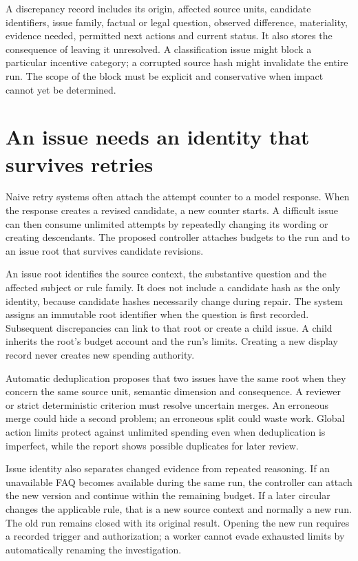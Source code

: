 A discrepancy record includes its origin, affected source units, candidate
identifiers, issue family, factual or legal question, observed difference,
materiality, evidence needed, permitted next actions and current status. It also
stores the consequence of leaving it unresolved. A classification issue might
block a particular incentive category; a corrupted source hash might invalidate
the entire run. The scope of the block must be explicit and conservative when
impact cannot yet be determined.

\section{An issue needs an identity that survives retries}

Naive retry systems often attach the attempt counter to a model response. When
the response creates a revised candidate, a new counter starts. A difficult issue
can then consume unlimited attempts by repeatedly changing its wording or
creating descendants. The proposed controller attaches budgets to the run and to
an issue root that survives candidate revisions.

An issue root identifies the source context, the substantive question and the
affected subject or rule family. It does not include a candidate hash as the only
identity, because candidate hashes necessarily change during repair. The system
assigns an immutable root identifier when the question is first recorded.
Subsequent discrepancies can link to that root or create a child issue. A child
inherits the root's budget account and the run's limits. Creating a new display
record never creates new spending authority.

Automatic deduplication proposes that two issues have the same root when they
concern the same source unit, semantic dimension and consequence. A reviewer or
strict deterministic criterion must resolve uncertain merges. An erroneous merge
could hide a second problem; an erroneous split could waste work. Global action
limits protect against unlimited spending even when deduplication is imperfect,
while the report shows possible duplicates for later review.

Issue identity also separates changed evidence from repeated reasoning. If an
unavailable FAQ becomes available during the same run, the controller can attach
the new version and continue within the remaining budget. If a later circular
changes the applicable rule, that is a new source context and normally a new run.
The old run remains closed with its original result. Opening the new run requires
a recorded trigger and authorization; a worker cannot evade exhausted limits by
automatically renaming the investigation.

